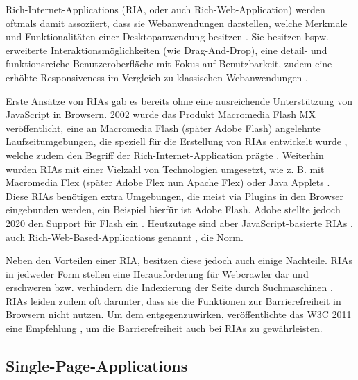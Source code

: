 
Rich-Internet-Applications (RIA, oder auch Rich-Web-Application) werden oftmals damit assoziiert, dass sie Webanwendungen darstellen, welche Merkmale und Funktionalitäten einer Desktopanwendung besitzen \cite{TenYearsOfRIAs} \cite{NecessityOfMethodologiesToModelRIAs}. Sie besitzen bspw. erweiterte Interaktionsmöglichkeiten (wie Drag-And-Drop), eine detail- und funktionsreiche Benutzeroberfläche mit Fokus auf Benutzbarkeit, zudem eine erhöhte Responsiveness im Vergleich zu klassischen Webanwendungen \cite{TenYearsOfRIAs}.

Erste Ansätze von RIAs gab es bereits ohne eine ausreichende Unterstützung von Java\-Script in Browsern. 2002 wurde das Produkt Macromedia Flash MX veröffentlicht, eine an Macromedia Flash (später Adobe Flash) angelehnte Laufzeitumgebungen, die speziell für die Erstellung von RIAs entwickelt wurde \cite{MacromediaFlashMXWhitePaper}, welche zudem den Begriff der Rich-Internet-Application prägte \cite{TenYearsOfRIAs}. Weiterhin wurden RIAs mit einer Vielzahl von Technologien umgesetzt, wie z. B. mit Macromedia Flex (später Adobe Flex nun Apache Flex) oder Java Applets \cite{NecessityOfMethodologiesToModelRIAs} \cite{RIAsTheNextStageOfApplicationDevelopment} \cite{RichInternetApplications} \cite{FinkIntroducingSPAs}. Diese RIAs benötigen extra Umgebungen, die meist via Plugins in den Browser eingebunden werden, ein Beispiel hierfür ist Adobe Flash. Adobe stellte jedoch 2020 den Support für Flash ein \cite{Netlytic}. Heutzutage sind aber JavaScript-basierte RIAs \cite{RIAsTheNextStageOfApplicationDevelopment}, auch Rich-Web-Based-Applications genannt \cite{RichWebBasedApplications} \cite{Netlytic}, die Norm. 

Neben den Vorteilen einer RIA, besitzen diese jedoch auch einige Nachteile. RIAs in jedweder Form stellen eine Herausforderung für Webcrawler dar und erschweren bzw. verhindern die Indexierung der Seite durch Suchmaschinen \cite{CrawlingRIAs}. RIAs leiden zudem oft darunter, dass sie die Funktionen zur Barrierefreiheit in Browsern nicht nutzen. Um dem entgegenzuwirken, veröffentlichte das W3C 2011 eine Empfehlung \cite{W3CAccessibleRIAs}, um die Barrierefreiheit auch bei RIAs zu gewährleisten.

\subsection{Single-Page-Applications}
\label{sec:single-page-applications}

